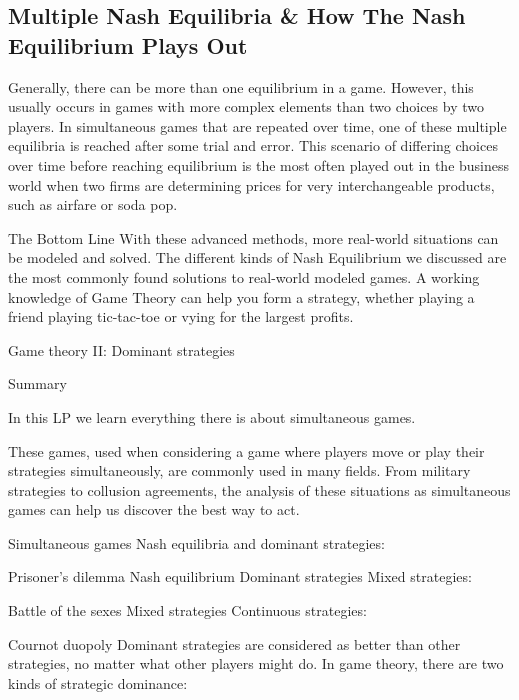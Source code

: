 \subsection{Multiple Nash Equilibria & How The Nash Equilibrium Plays Out}
Generally, there can be more than one equilibrium in a game. However, this usually occurs in games with more complex elements than two choices by two players. In simultaneous games that are repeated over time, one of these multiple equilibria is reached after some trial and error. This scenario of differing choices over time before reaching equilibrium is the most often played out in the business world when two firms are determining prices for very interchangeable products, such as airfare or soda pop.

The Bottom Line
With these advanced methods, more real-world situations can be modeled and solved. The different kinds of Nash Equilibrium we discussed are the most commonly found solutions to real-world modeled games. A working knowledge of Game Theory can help you form a strategy, whether playing a friend playing tic-tac-toe or vying for the largest profits.



Game theory II: Dominant strategies

Summary

In this LP we learn everything there is about simultaneous games. 

These games, used when considering a game where players move or play their strategies simultaneously, are commonly used in many fields. From military strategies to collusion agreements, the analysis of these situations as simultaneous games can help us discover the best way to act.

Simultaneous games
Nash equilibria and dominant strategies:

Prisoner’s dilemma
Nash equilibrium
Dominant strategies
Mixed strategies:

Battle of the sexes
Mixed strategies
Continuous strategies:

Cournot duopoly
Dominant strategies are considered as better than other strategies, no matter what other players might do. In game theory, there are two kinds of strategic dominance:

